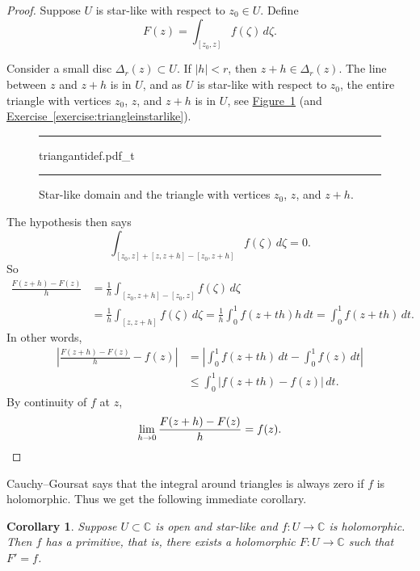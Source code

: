 \documentclass[12pt,openany]{book}
\newcommand{\sabs}[1]{\lvert {#1} \rvert}
\newcommand{\abs}[1]{\left\lvert {#1} \right\rvert}
\newcommand{\C}{{\mathbb{C}}}
\theoremstyle{plain}
\newtheorem{cor}[thm]{Corollary}
\theoremstyle{remark}
\theoremstyle{definition}
\newenvironment{myfig}{%
\begin{figure}[h!t]
\noindent\rule{\textwidth}{0.4pt}\vspace{12pt}\par\centering}%
{\par\noindent\rule{\textwidth}{0.4pt}
\end{figure}}
\theoremstyle{exercise}
\theoremstyle{example}
\newcommand{\figureref}[1]{\hyperref[#1]{Figure~\ref*{#1}}}
\newcommand{\exerciseref}[1]{\hyperref[#1]{Exercise~\ref*{#1}}}
\begin{document}
\begin{proof}
Suppose $U$ is star-like with respect to $z_0 \in U$.
Define
\begin{equation*}
F(z) = \int_{[z_0,z]} f(\zeta) \, d\zeta .
\end{equation*}

Consider a small disc $\Delta_r(z) \subset U$.
If $\sabs{h} < r$, then
$z+h \in \Delta_r(z)$.
The line between $z$ and $z+h$ is in $U$, and
as $U$ is star-like with respect to $z_0$, 
the entire triangle with
vertices $z_0$, $z$, and $z+h$
is in $U$, see \figureref{fig:triangantidef}
(and \exerciseref{exercise:triangleinstarlike}).
\begin{myfig}
{triangantidef.pdf_t}
\caption{Star-like domain and the triangle with vertices
$z_0$, $z$, and $z+h$.\label{fig:triangantidef}}
\end{myfig}

The
hypothesis then says
\begin{equation*}
\int_{[z_0,z]+[z,z+h]-[z_0,z+h]} f(\zeta) \, d\zeta = 0 .
\end{equation*}
So
\begin{equation*}
\begin{split}
\frac{F(z+h)-F(z)}{h} &=
\frac{1}{h}
\int_{[z_0,z+h]-[z_0,z]} f(\zeta) \, d\zeta
\\
& =
\frac{1}{h}
\int_{[z,z+h]} f(\zeta) \, d\zeta
=
\frac{1}{h}
\int_0^1 f(z+th) h \, dt
=
\int_0^1 f(z+th) \, dt .
\end{split}
\end{equation*}
In other words,
\begin{equation*}
\begin{split}
\abs{
\frac{F(z+h)-F(z)}{h} 
-
f(z)
}
& =
\abs{
\int_0^1 f(z+th) \, dt
-
\int_0^1 f(z) \, dt
}
\\
& \leq
\int_0^1 \abs{f(z+th)-f(z)} \, dt .
\end{split}
\end{equation*}
By continuity of $f$ at $z$,
\begin{equation*}
\lim_{h \to 0}
\frac{F(z+h)-F(z)}{h} 
=
f(z) . \qedhere
\end{equation*}
\end{proof}

Cauchy--Goursat says that the integral around
triangles is always zero if $f$ is holomorphic.  Thus we get
the following immediate corollary.

\begin{cor} \label{cor:primitiveinstarlike}
Suppose $U \subset \C$ is open and star-like
and $f \colon U \to \C$ is holomorphic.
Then $f$ has a primitive, that is,
there exists a holomorphic $F \colon U \to \C$
such that $F' = f$.
\end{cor}
\end{document}
